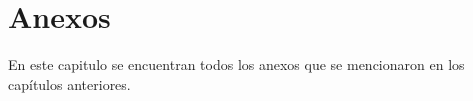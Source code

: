 \appendix 
\chapter{Anexos}
En este capitulo se encuentran todos los anexos que se mencionaron en los 
capítulos anteriores.











